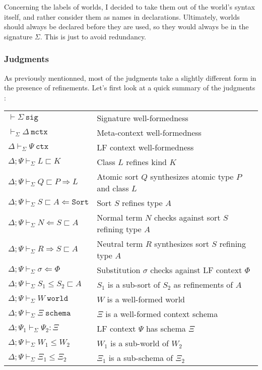 \documentclass[letterpaper, 11pt]{article}
\newcommand{\Rar}{\Rightarrow}
\newcommand{\Lar}{\Leftarrow}
\newcommand{\Sort}{\texttt{Sort}}
\newcommand{\world}{\texttt{world}}
\newcommand{\schema}{\texttt{schema}}
\newcommand{\ctx}{\texttt{ctx}}
\newcommand{\mctx}{\texttt{mctx}}
\newcommand{\sctx}{\texttt{sctx}}
\newcommand{\sig}{\texttt{sig}}
\begin{document}
    Concerning the labels of worlds, I decided to take them out of the world's syntax itself, and rather consider them as names in declarations.  
    Ultimately, worlds should always be declared before they are used, so they would always be in the signature $\Sigma$.  This is just to avoid redundancy.

    \subsubsection{Judgments}
    As previously mentionned, most of the judgments take a slightly different form in the presence of refinements.  Let's first look at a 
    quick summary of the judgments :

    \begin{tabular}{ll}
        $ \vdash \Sigma \ \sig $                                       & Signature well-formedness \\
        $ \vdash_\Sigma \Delta \ \mctx $                         & Meta-context well-formedness \\
        $  \Delta \vdash_\Sigma \Psi \ \ctx $                    & LF context well-formedness \\
        $  \Delta; \Psi \vdash_\Sigma L \sqsubset K $            & Class $L$ refines kind $K$ \\
        $  \Delta; \Psi \vdash_\Sigma Q \sqsubset P \Rar L $     & Atomic sort $Q$ synthesizes atomic type $P$ and class $L$ \\
        $  \Delta; \Psi \vdash_\Sigma S \sqsubset A \Lar \Sort $ & Sort $S$ refines type $A$ \\
        $  \Delta; \Psi \vdash_\Sigma N \Lar S \sqsubset A $     & Normal term $N$ checks against sort $S$ refining type $A$ \\
        $  \Delta; \Psi \vdash_\Sigma R \Rar S \sqsubset A $     & Neutral term $R$ synthesizes sort $S$ refining type $A$ \\
        $  \Delta; \Psi \vdash_\Sigma \sigma \Lar \Phi $         & Substitution $\sigma$ checks against LF context $\Phi$ \\
        $  \Delta; \Psi \vdash_\Sigma S_1 \leq S_2 \sqsubset A $ & $S_1$ is a sub-sort of $S_2$ as refinements of $A$ \\
        $  \Delta; \Psi \vdash_\Sigma W \ \world $               & $W$ is a well-formed world \\
        $  \Delta; \Psi \vdash_\Sigma \Xi \ \schema $            & $\Xi$ is a well-formed context schema \\
        $  \Delta; \Psi_1 \vdash_\Sigma \Psi_2 : \Xi $           & LF context $\Psi$ has schema $\Xi$ \\
        $  \Delta; \Psi \vdash_\Sigma W_1 \leq W_2 $             & $W_1$ is a sub-world of $W_2$\\
        $  \Delta; \Psi \vdash_\Sigma \Xi_1 \leq \Xi_2 $         & $\Xi_1$ is a sub-schema of $\Xi_2$
    \end{tabular}
\end{document}
